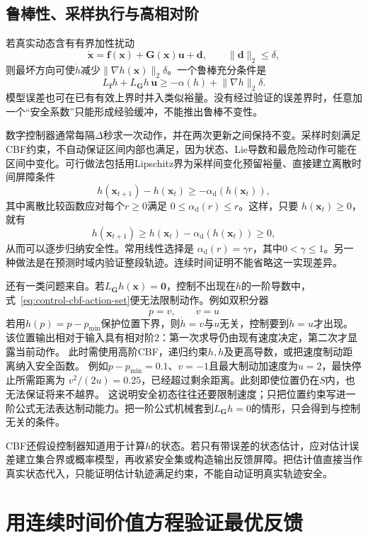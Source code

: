 \subsection{鲁棒性、采样执行与高相对阶}
若真实动态含有有界加性扰动
\[
  \dot{\bm{x}}
  =
  \bm{f}(\bm{x})+\bm{G}(\bm{x})\bm{u}
  +\bm{d},
  \qquad
  \lVert\bm{d}\rVert_2\leq\delta,
\]
则最坏方向可使$\dot h$减少$\lVert\nabla h(\bm{x})\rVert_2\delta$。一个鲁棒充分条件是
\begin{equation}
  L_{\bm{f}}h
  +
  L_{\bm{G}}h\,\bm{u}
  \geq
  -\alpha(h)
  +
  \lVert\nabla h\rVert_2\delta.
  \label{eq:control-robust-cbf}
\end{equation}
模型误差也可在已有有效上界时并入类似裕量。没有经过验证的误差界时，任意加一个“安全系数”只能形成经验缓冲，不能推出鲁棒不变性。

数字控制器通常每隔$\Delta$秒求一次动作，并在两次更新之间保持不变。采样时刻满足CBF约束，不自动保证区间内部也满足，因为状态、Lie导数和最危险动作可能在区间中变化。可行做法包括用Lipschitz界为采样间变化预留裕量、直接建立离散时间屏障条件
\[
  h(\bm{x}_{t+1})-h(\bm{x}_t)
  \geq-\alpha_{\mathrm d}(h(\bm{x}_t)),
\]
其中离散比较函数应对每个$r\geq0$满足
$0\leq\alpha_{\mathrm d}(r)\leq r$。这样，只要
$h(\bm{x}_t)\geq0$，就有
\[
  h(\bm{x}_{t+1})
  \geq
  h(\bm{x}_t)-\alpha_{\mathrm d}(h(\bm{x}_t))
  \geq0,
\]
从而可以逐步归纳安全性。常用线性选择是
$\alpha_{\mathrm d}(r)=\gamma r$，其中$0<\gamma\leq1$。另一种做法是在预测时域内验证整段轨迹。连续时间证明不能省略这一实现差异。

还有一类问题来自。若$L_{\bm{G}}h(\bm{x})=\bm{0}$，控制不出现在$h$的一阶导数中，式~\eqref{eq:control-cbf-action-set}便无法限制动作。例如双积分器
\[
  \dot p=v,\qquad \dot v=u
\]
若用$h(p)=p-p_{\min}$保护位置下界，则$\dot h=v$与$u$无关，控制要到$\ddot h=u$才出现。该位置输出相对于输入具有相对阶$2$：第一次求导仍由现有速度决定，第二次才显露当前动作。
此时需使用高阶CBF，递归约束$h,\dot h$及更高导数，或把速度制动距离纳入安全函数。
例如$p-p_{\min}=0.1$、$v=-1$且最大制动加速度为$u=2$，最快停止所需距离为
$v^2/(2u)=0.25$，已经超过剩余距离。此刻即使位置仍在$S$内，也无法保证将来不越界。
这说明安全初态往往还要限制速度；只把位置约束写进一阶公式无法表达制动能力。把一阶公式机械套到$L_{\bm{G}}h=0$的情形，只会得到与控制无关的条件。

CBF还假设控制器知道用于计算$h$的状态。若只有带误差的状态估计，应对估计误差建立集合界或概率模型，再收紧安全集或构造输出反馈屏障。把估计值直接当作真实状态代入，只能证明估计轨迹满足约束，不能自动证明真实轨迹安全。
\section{用连续时间价值方程验证最优反馈}
\label{sec:control-hjb}

